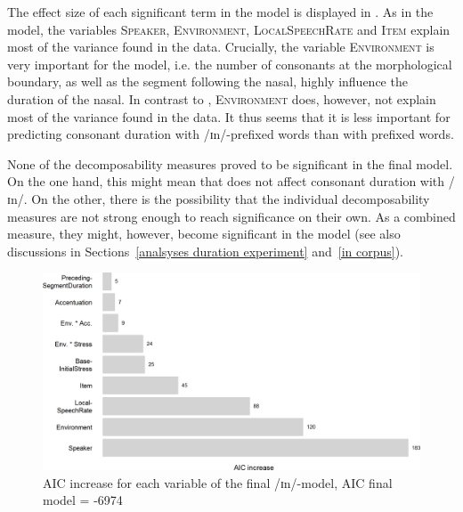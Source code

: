 
The effect size of each significant term in the model is displayed in . As in the model, the variables \textsc{Speaker}, \textsc{Environment}, \textsc{LocalSpeechRate} and \textsc{Item} explain most of the variance found in the data. Crucially, the variable \textsc{Environment} is very important for the model, i.e. the number of consonants at the morphological boundary, as well as the segment following the nasal, highly influence the duration of the nasal. In contrast to , \textsc{Environment} does, however, not explain most of the variance found in the data. It thus seems that it is less important for predicting consonant duration with /ɪn/-prefixed words than with prefixed words. 






None of the decomposability measures proved to be significant in the final model. On the one hand, this might mean that  does not affect consonant duration with /ɪn/. On the other, there is the possibility that the individual decomposability measures are not strong enough to reach significance on their own. As a combined  measure, they might, however, become significant in the model (see also discussions in Sections~\ref{analsyses duration experiment} and~\ref{in corpus}).





\begin{figure}
	
	\includegraphics[scale=0.7]{images/Experiment/AICdecreaseInComplex.png}
	
	\caption{AIC increase for each variable of the final /ɪn/-model, AIC final model = -6974}
	\label{fig:Effect sizes InComplex Exp}
	
\end{figure}


